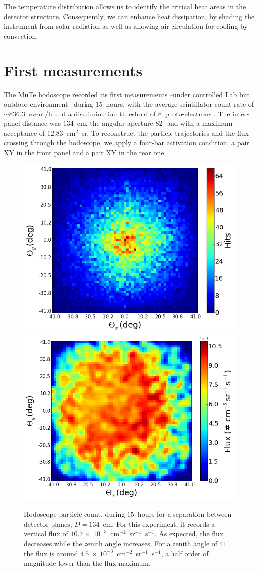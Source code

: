 \documentclass[letterpaper,11pt]{article}
\begin{document}
The temperature distribution allows us to identify the critical heat areas in the detector structure. Consequently, we can enhance heat dissipation, by shading the instrument from solar radiation as well as allowing air circulation for cooling by convection. 

\section{First measurements}
\label{measurement}
The MuTe hodoscope recorded its first measurements --under controlled Lab but outdoor environment-- during $15$~hours, with the average scintillator count rate of $\sim 836.3$~event/h and a discrimination threshold of $8$~photo-electrons \cite{PenaRodriguez2019}. The inter-panel distance was $134$~cm, the angular aperture $82^{\circ}$ and with a maximum acceptance of $12.83$~cm$^{2}$~sr.  To reconstruct the particle trajectories and the flux crossing through the hodoscope, we apply a four-bar activation condition: a pair XY in the front panel and a pair XY in the rear one. 


\begin{figure}[htb]
\centering
\includegraphics[width=0.48\columnwidth]{Figures/Hits_15h.png}
\includegraphics[width=0.49\columnwidth]{Figures/Flux.png}
\caption{Hodoscope particle count, during $15$~hours for a separation between detector planes, $D=134$~cm. For this experiment, it records a vertical flux of $10.7~\times~10^{-3}$~cm$^{-2}$~sr$^{-1}$~s$^{-1}$. As expected, the flux decreases while the zenith angle increases. For a zenith angle of $41^{\circ}$ the flux is around $4.5~\times~10^{-3}$~cm$^{-2}$~sr$^{-1}$~s$^{-1}$, a half order of magnitude lower than the flux maximum.}
\label{fig:hits_15}
\end{figure}
\end{document}
